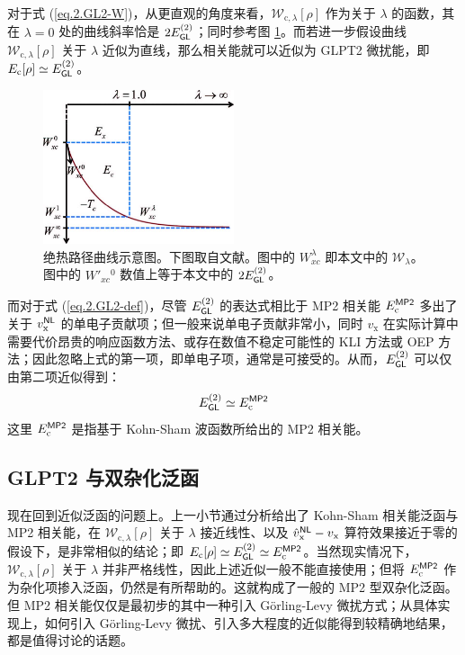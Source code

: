 对于式 (\ref{eq.2.GL2-W})，从更直观的角度来看，$\mathcal{W}_{\mathrm{c}, \lambda} [\rho]$ 作为关于 $\lambda$ 的函数，其在 $\lambda = 0$ 处的曲线斜率恰是 $2 E_{\textsf{GL}}^{(2)}$；同时参考图 \ref{fig.2.adiabatic-curve}。而若进一步假设曲线 $\mathcal{W}_{\mathrm{c}, \lambda} [\rho]$ 关于 $\lambda$ 近似为直线，那么相关能就可以近似为 GLPT2 微扰能，即 $E_\mathrm{c} [\rho] \simeq E_{\textsf{GL}}^{(2)}$。

\begin{figure}[h]
  \centering
  \includegraphics[width=0.5\textwidth]{assets/adiabatic-curve.jpg}
  \caption[绝热路径曲线示意图]{绝热路径曲线示意图。下图取自文献\cite{Su-Xu.JCP.2014}。图中的 $W_{xc}^{\lambda}$ 即本文中的 $\mathcal{W}_{\lambda}$。图中的 $W'_{xc}{}^{0}$ 数值上等于本文中的 $2 E_{\textsf{GL}}^{(2)}$。}
  \label{fig.2.adiabatic-curve}
\end{figure}

而对于式 (\ref{eq.2.GL2-def})，尽管 $E_{\textsf{GL}}^{(2)}$ 的表达式相比于 MP2 相关能 $E_\mathrm{c}^{\textsf{MP2}}$ 多出了关于 $v_\mathrm{x}^{\textsf{NL}}$ 的单电子贡献项；但一般来说单电子贡献非常小\cite{DellaSala-Goerling.JCP.2001}，同时 $v_\mathrm{x}$ 在实际计算中需要代价昂贵的响应函数方法\cite{Goerling-Goerling.PRL.1999}、或存在数值不稳定可能性的 KLI 方法\cite{Krieger-Iafrate.PRA.1992, DellaSala-Goerling.JCP.2001}或 OEP 方法\cite{Mori-Sanchez-Yang.JCP.2005}；因此忽略上式的第一项，即单电子项，通常是可接受的。从而，$E_{\textsf{GL}}^{(2)}$ 可以仅由第二项近似得到：
\begin{equation}
  E_{\textsf{GL}}^{(2)} \simeq E_\mathrm{c}^{\textsf{MP2}}
\end{equation}
这里 $E_\mathrm{c}^{\textsf{MP2}}$ 是指基于 Kohn-Sham 波函数所给出的 MP2 相关能。

\subsection{GLPT2 与双杂化泛函}
\label{sec.2.glpt2-dh}

现在回到近似泛函的问题上。上一小节通过分析给出了 Kohn-Sham 相关能泛函与 MP2 相关能，在 $\mathcal{W}_{\mathrm{c}, \lambda} [\rho]$ 关于 $\lambda$ 接近线性、以及 $\hat v_\mathrm{x}^{\textsf{NL}} - v_\mathrm{x}$ 算符效果接近于零的假设下，是非常相似的结论；即 $E_\mathrm{c} [\rho] \simeq E_{\textsf{GL}}^{(2)} \simeq E_\mathrm{c}^{\textsf{MP2}}$。当然现实情况下，$\mathcal{W}_{\mathrm{c}, \lambda} [\rho]$ 关于 $\lambda$ 并非严格线性，因此上述近似一般不能直接使用；但将 $E_\mathrm{c}^{\textsf{MP2}}$ 作为杂化项掺入泛函，仍然是有所帮助的。这就构成了一般的 MP2 型双杂化泛函。但 MP2 相关能仅仅是最初步的其中一种引入 G\"orling-Levy 微扰方式；从具体实现上，如何引入 G\"orling-Levy 微扰、引入多大程度的近似能得到较精确地结果，都是值得讨论的话题。

